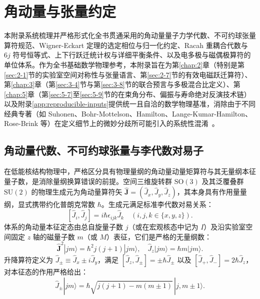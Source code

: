 \chapter{角动量与张量约定}\label{app:angular-momentum-tensors}

本附录系统梳理并严格形式化全书贯通采用的角动量量子力学代数、不可约球张量算符规范、Wigner-Eckart 定理的选定相位与归一化约定、Racah 重耦合代数与 $6j$ 符号恒等式、上下行跃迁统计权与详细平衡条件、以及电多极与磁偶极算符的单位体系。作为全书基础数学物理参考，本附录旨在为第\ref{chap:2}章（特别是第\ref{sec:2-1}节的实验室空间对称性与张量语言、第\ref{sec:2-7}节的有效电磁跃迁算符）、第\ref{chap:3}章（第\ref{sec:3-4}节与第\ref{sec:3-8}节的联合预言与多极混合比定义）、第\ref{chap:5}章（第\ref{sec:5-7}至\ref{sec:5-9}节的在束角分布、偏振与寿命绝对反演技术链）以及附录\ref{app:reproducible-inputs}提供统一且自洽的数学物理基准，消除由于不同经典专著（如 Suhonen、Bohr-Mottelson、Hamilton、Lange-Kumar-Hamilton、Rose-Brink 等）在定义细节上的微妙分歧所可能引入的系统性混淆~\cite{book-suhonen-from-nucleons-to-nucleus,book-bohr-mottelson-nuclear-structure,lange-kumar-hamilton-1982-multipole-admixtures}。

\section{角动量代数、不可约球张量与李代数对易子}\label{sec:appA-1}

在低能核结构物理中，严格区分具有物理量纲的角动量动量矩算符与其无量纲本征量子数，是消除量纲换算错误的前提。空间三维旋转群 $\mathrm{SO}(3)$ 及其泛覆叠群 $\mathrm{SU}(2)$ 的物理生成元为角动量算符矢 $\hat{\mathbf{J}} = (\hat{J}_x, \hat{J}_y, \hat{J}_z)$，其本身具有作用量量纲，显式携带约化普朗克常数 $\hbar$。生成元满足标准李代数对易关系：
\begin{equation}\label{eq:appA-lie-comm}
[\hat{J}_i, \hat{J}_j] = i \hbar \epsilon_{ijk} \hat{J}_k \quad (i, j, k \in \{x, y, z\}) .
\end{equation}
体系的角动量本征定态由总自旋量子数 $j$（或在宏观核态中记为 $I$）及沿实验室空间固定 $z$ 轴的磁量子数 $m$（或 $M$）表征，它们是严格的无量纲数：
\begin{equation}\label{eq:appA-j-eigen}
\hat{\mathbf{J}}^2 |j m\rangle = \hbar^2 j(j+1) |j m\rangle , \quad \hat{J}_z |j m\rangle = \hbar m |j m\rangle .
\end{equation}
升降算符定义为 $\hat{J}_\pm \equiv \hat{J}_x \pm i \hat{J}_y$，满足 $[\hat{J}_z, \hat{J}_\pm] = \pm \hbar \hat{J}_\pm$ 以及 $[\hat{J}_+, \hat{J}_-] = 2\hbar \hat{J}_z$，对本征态的作用严格给出：
\begin{equation}\label{eq:appA-ladder-action}
\hat{J}_\pm |j m\rangle = \hbar \sqrt{j(j+1) - m(m \pm 1)} \, |j, m \pm 1\rangle .
\end{equation}


